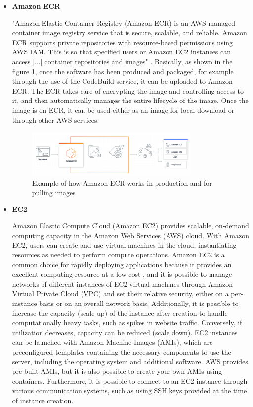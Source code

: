 \begin{itemize}
    \item \textbf{Amazon ECR}
    
    "Amazon Elastic Container Registry (Amazon ECR) is an AWS managed container image registry service that is secure, scalable, and reliable. Amazon ECR supports private repositories with resource-based permissions using AWS IAM. This is so that specified users or Amazon EC2 instances can access [...] container repositories and images" \cite{AmazonECR}. Basically, as shown in the figure \ref{fig:AWSECR}, once the software has been produced and packaged, for example through the use of the CodeBuild service, it can be uploaded to Amazon ECR. The ECR takes care of encrypting the image and controlling access to it, and then automatically manages the entire lifecycle of the image. Once the image is on ECR, it can be used either as an image for local download or through other AWS services. 
    \begin{figure}[h]  %
        \centering
        \includegraphics[width=0.8\textwidth]{images/AWSECR.png}  %
        \caption{Example of how Amazon ECR works in production and for pulling images \cite{AWSECR}}
        \label{fig:AWSECR}
    \end{figure}
    
    \item \textbf{EC2}
    
    Amazon Elastic Compute Cloud (Amazon EC2) provides scalable, on-demand computing capacity in the Amazon Web Services (AWS) cloud. With Amazon EC2, users can create and use virtual machines in the cloud, instantiating resources as needed to perform compute operations. Amazon EC2 is a common choice for rapidly deploying applications because it provides an excellent computing resource at a low cost \cite{AWSEC2}, and it is possible to manage networks of different instances of EC2 virtual machines through Amazon Virtual Private Cloud (VPC) and set their relative security, either on a per-instance basis or on an overall network basis. Additionally, it is possible to increase the capacity (scale up) of the instance after creation to handle computationally heavy tasks, such as spikes in website traffic. Conversely, if utilization decreases, capacity can be reduced (scale down). EC2 instances can be launched with Amazon Machine Images (AMIs), which are preconfigured templates containing the necessary components to use the server, including the operating system and additional software. AWS provides pre-built AMIs, but it is also possible to create your own AMIs using containers. Furthermore, it is possible to connect to an EC2 instance through various communication systems, such as using SSH keys provided at the time of instance creation.
    

\end{itemize}
